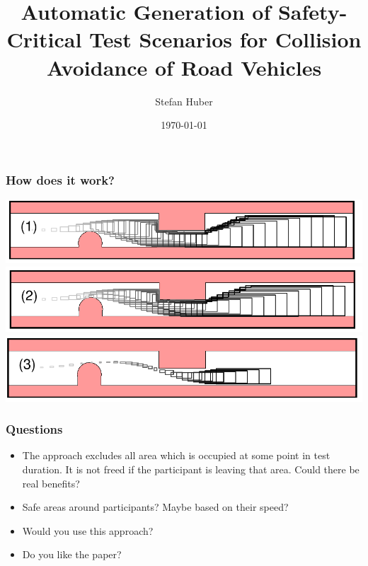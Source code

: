 \documentclass{beamer}
\title{Automatic Generation of Safety-Critical Test Scenarios for Collision Avoidance of Road Vehicles}
\author{Stefan Huber}
\date{\today}
\begin{document}
\maketitle

\begin{frame}
    \frametitle{How does it work?}
    \includegraphics[width=\textwidth]{drivableArea(1).png}
    \pause
    \includegraphics[width=\textwidth]{drivableArea(2).png}
    \pause
    \includegraphics[width=\textwidth]{drivableArea(3).png}
\end{frame}

\begin{frame}
    \frametitle{Questions}
    \begin{itemize}
        \item The approach excludes all area which is occupied at some point in test duration.
            It is not freed if the participant is leaving that area.
            Could there be real benefits?
        \item Safe areas around participants? Maybe based on their speed?
        \item Would you use this approach?
        \item Do you like the paper?
    \end{itemize}
\end{frame}
\end{document}
